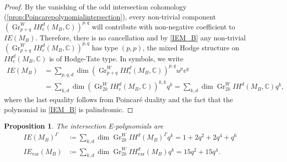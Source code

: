 \documentclass[JEP,XML,SOM,Unicode, NoEqCountersInSection,NoFloatCountersInSection,published]{cedram}
\newcommand{\cc}{\mathrm{c}}
\newcommand{\IE}{\mathit{IE}}
\newcommand{\IH}{\mathit{IH}}
\newtheorem{prop}[thm]{Proposition}
\theoremstyle{definition}
\newcommand{\CC}{\mathbb{C}}
\newcommand{\Gr}{\operatorname{Gr}}
\begin{document}
\begin{proof}
By the vanishing of the odd intersection cohomology (\cf \cref{prop:Poincarepolynomialintersection}), every non-trivial component $(\Gr^W_{p+q} \IH^d_{\cc}(M_B, \CC))^{p,q}$ will contribute with non-negative coef\-ficient to $\IE(M_B)$. Therefore, there is no cancellation and by \eqref{IEM_B} any non-trivial $(\Gr^W_{p+q} \IH^d_{\cc}(M_B, \CC))^{p,q}$ has type $(p,p)$, \ie the mixed Hodge structure on $\IH^d_{\cc}(M_B, \CC)$ is of Hodge-Tate type.
In symbols, we write
\begin{align*}
\IE(M_B) & = \sum_{p,q, d} \dim ( \Gr^W_{p+q} \IH^d_{\cc}(M_B, \CC))^{p,q} u^pv^q\\
& = \sum_{k, d} \dim (\Gr^W_{2k} \IH^d_{\cc}(M_B, \CC))^{k,k} q^k = \sum_{k, d} \dim \Gr^W_{2k} \IH^d(M_B, \CC) q^k,
\end{align*}
where the last equality follows from Poincaré duality and the fact that the polynomial in \eqref{IEM_B} is palindromic.
\end{proof}

\begin{prop}\label{prop:Epolynomialinvvar}
The intersection E-polynomials are
\begin{align*}
\IE(M_B)^{\Gamma} & \coloneqq \sum_{k, d} \dim \Gr^W_{2k}\IH^d(M_B)^{\Gamma} q^k = 1+2q^2+2q^4+q^6\\
\IE_{\mathrm{var}}(M_B) & \coloneqq \sum_{k, d} \dim \Gr^W_{2k}\IH^d_{\mathrm{var}}(M_B)q^k = 15q^2+15q^4.
\end{align*}
\end{prop}
\end{document}
